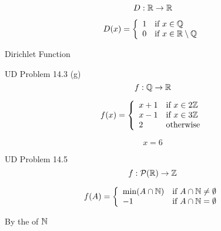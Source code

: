 \begin{frame}{}
  \[
    D: \mathbb{R}{} \to \mathbb{R}{}
  \]

  \[
    D(x) = \left\{\begin{array}{ll}
      1 & \text{if } x \in \mathbb{Q} \\
      0 & \text{if } x \in \mathbb{R} \setminus \mathbb{Q} 
    \end{array}\right.
  \]

  \vspace{0.60cm}
  \centerline{Dirichlet Function}
\end{frame}

% 
% 

\begin{frame}{}
  \begin{exampleblock}{UD Problem 14.3 (g)}
    \[
      f: \mathbb{Q} \to \mathbb{R}{}
    \]

    \[
      f(x) = \left\{\begin{array}{ll}
	x + 1 & \text{if } x \in 2\mathbb{Z}{} \\
	x - 1 & \text{if } x \in 3\mathbb{Z}{} \\
	2     & \text{otherwise}
      \end{array}\right.
    \]
  \end{exampleblock}

  \pause
  \[
    x = 6
  \]
\end{frame}

\begin{frame}{}
  \begin{exampleblock}{UD Problem 14.5}
    \[
      f: \mathcal{P}(\mathbb{R}{}) \to \mathbb{Z}{}
    \]

    \[
      f(A) = \left\{\begin{array}{ll}
	\min(A \cap \mathbb{N}{}) & \text{if } A \cap \mathbb{N}{} \neq \emptyset \\
	-1 & \text{if } A \cap \mathbb{N}{} = \emptyset
      \end{array}\right.
    \]
  \end{exampleblock}

  \pause
  \vspace{0.50cm}
  \begin{center}
    By the  of $\mathbb{N}{}$
  \end{center}
\end{frame}
